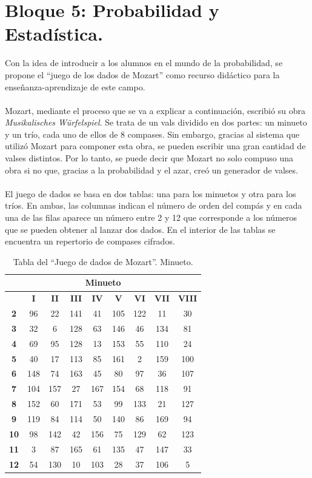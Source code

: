 \documentclass[a4paper, openright, 11pt, titlepage]{report}
\theoremstyle{definition}\newtheorem{defin}[propo]{Definition}
\theoremstyle{definition}\newtheorem{obser}[propo]{Remark}
\theoremstyle{definition}\newtheorem{ejem}[propo]{Ejemplo}
\theoremstyle{definition}\newtheorem{algoritmo}[propo]{Algoritmo}
\begin{document}
\section{Bloque 5: Probabilidad y Estadística.}
Con la idea de introducir a los alumnos en el mundo de la probabilidad, se propone el ``juego de los dados de Mozart'' como recurso didáctico para la enseñanza-aprendizaje de este campo.\\\\
Mozart, mediante el proceso que se va a explicar a continuación, escribió su obra \textit{Musikalisches Würfelspiel}. Se trata de un vals dividido en dos partes: un minueto y un trío, cada uno de ellos de 8 compases. Sin embargo, gracias al sistema que utilizó Mozart para componer esta obra, se pueden escribir una gran cantidad de valses distintos. Por lo tanto, se puede decir que Mozart no solo compuso una obra si no que, gracias a la probabilidad y el azar, creó un generador de valses.\\\\
El juego de dados se basa en dos tablas: una para los minuetos y otra para los tríos. En ambas, las columnas indican el número de orden del compás y en cada una
de las filas aparece un número entre 2 y 12 que corresponde a los números que se pueden obtener al lanzar dos dados.
En el interior de las tablas se encuentra un repertorio de compases cifrados.
\begin{table}[H]
    \centering
    \begin{tabular}{|c|c|c|c|c|c|c|c|c|}
    \hline
    \multicolumn{9}{|c|}{Minueto}\\
    \hline \hline 
         & \textbf{I} & \textbf{II} & \textbf{III} & \textbf{IV} & \textbf{V} & \textbf{VI} & \textbf{VII} & \textbf{VIII}\\
         \hline
         \textbf{2} & 96 & 22 & 141 & 41 & 105 & 122 & 11 & 30\\
         \hline
         \textbf{3} & 32 & 6 & 128 & 63 & 146 & 46 & 134 & 81\\
         \hline
         \textbf{4} & 69 & 95 & 128 & 13 & 153 & 55 & 110 & 24\\
         \hline
         \textbf{5} & 40 & 17 & 113 & 85 & 161 & 2 & 159 & 100\\
         \hline
         \textbf{6} & 148 & 74 & 163 & 45 & 80 & 97 & 36 & 107\\
         \hline
         \textbf{7} & 104 & 157 & 27 & 167 & 154 & 68 & 118 & 91\\
         \hline
         \textbf{8} & 152 & 60 & 171 & 53 & 99 & 133 & 21 & 127\\
         \hline
         \textbf{9} & 119 & 84 & 114 & 50 & 140 & 86 & 169 & 94\\
         \hline
         \textbf{10} & 98 & 142 & 42 & 156 & 75 & 129 & 62 & 123\\
         \hline
         \textbf{11} & 3 & 87 & 165 & 61 & 135 & 47 & 147 & 33\\
         \hline
         \textbf{12} & 54 & 130 & 10 & 103 & 28 & 37 & 106 & 5\\
         \hline
    \end{tabular}
    \caption{Tabla del ``Juego de dados de Mozart''. Minueto.}
\end{table}
\end{document}
